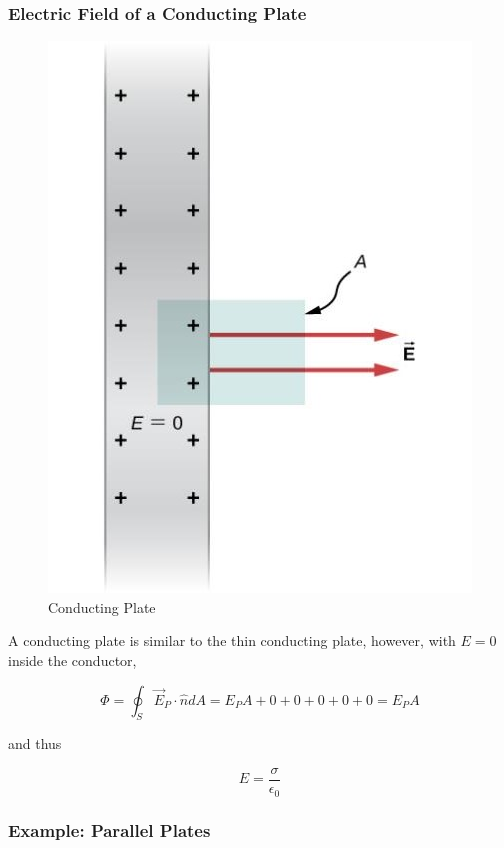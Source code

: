 \documentclass[14pt]{memoir}
\begin{document}
\subsubsection{Electric Field of a Conducting Plate}

\begin{figure}[H]
\begin{center}
\includegraphics[scale=0.30]{fig/fig_06_40.jpg}
\caption{Conducting Plate}
\label{fig:06_40}
\end{center}
\end{figure}

A conducting plate is similar to the thin conducting plate, however, with $E = 0$ inside the conductor, 

\begin{equation}
\Phi = \oint_S \vec{E}_P \cdot \hat{n} dA = E_P A + 0 + 0 + 0 +0 + 0 =  E_P A
\end{equation}

and thus

\begin{equation}
E = \frac{\sigma}{\epsilon_0}
\end{equation}

\subsubsection{Example: Parallel Plates}
\end{document}
